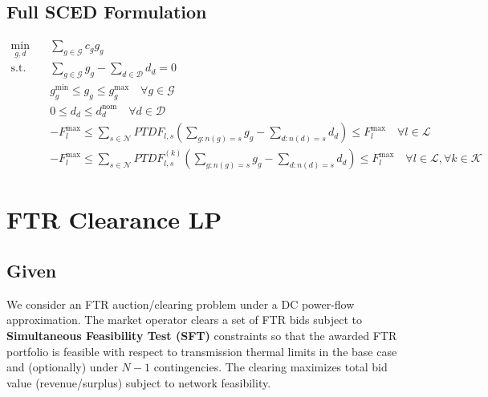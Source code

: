 \documentclass[11pt]{article}
\begin{document}
\subsection{ Full SCED Formulation}

\begin{align}
\min_{g,d} \quad
& \sum_{g \in \mathcal{G}} c_g g_g
\\[6pt]
\text{s.t.} \quad
& \sum_{g \in \mathcal{G}} g_g
-
\sum_{d \in \mathcal{D}} d_d
= 0
\\[6pt]
& g_g^{\min} \le g_g \le g_g^{\max}
\quad \forall g \in \mathcal{G}
\\[6pt]
& 0 \le d_d \le d_d^{\text{nom}}
\quad \forall d \in \mathcal{D}
\\[6pt]
& -F_l^{\max}
\le
\sum_{s \in \mathcal{N}} PTDF_{l,s}
\left(
\sum_{g: n(g)=s} g_g
-
\sum_{d: n(d)=s} d_d
\right)
\le
F_l^{\max}
\quad \forall l \in \mathcal{L}
\\[6pt]
& -F_l^{\max}
\le
\sum_{s \in \mathcal{N}} PTDF_{l,s}^{(k)}
\left(
\sum_{g: n(g)=s} g_g
-
\sum_{d: n(d)=s} d_d
\right)
\le
F_l^{\max}
\quad \forall l \in \mathcal{L}, \forall k \in \mathcal{K}
\end{align}

\section{FTR Clearance LP}
\subsection{Given}
We consider an FTR auction/clearing problem under a DC power-flow approximation.
The market operator clears a set of FTR bids subject to \textbf{Simultaneous Feasibility Test (SFT)}
constraints so that the awarded FTR portfolio is feasible with respect to transmission thermal limits
in the base case and (optionally) under $N\!-\!1$ contingencies. The clearing maximizes total bid value
(revenue/surplus) subject to network feasibility.
\end{document}
